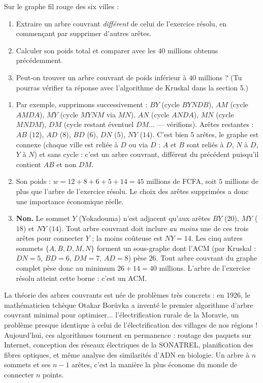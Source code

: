 \documentclass[11pt]{article}
\begin{document}
\begin{exercice}
Sur le graphe fil rouge des six villes :
\begin{enumerate}
\item Extraire un arbre couvrant \emph{différent} de celui de l'exercice résolu, en commençant par supprimer d'autres arêtes.
\item Calculer son poids total et comparer avec les $40$ millions obtenus précédemment.
\item Peut-on trouver un arbre couvrant de poids inférieur à $40$ millions ? (Tu pourras vérifier ta réponse avec l'algorithme de Kruskal dans la section 5.)
\end{enumerate}
\end{exercice}

\begin{corrige}
\begin{enumerate}
\item Par exemple, supprimons successivement : $BY$ (cycle $B Y N D B$), $AM$ (cycle $A M D A$), $MY$ (cycle $M Y N M$ via $MN$), $AN$ (cycle $A N D A$), $MN$ (cycle $M N D M$), $DM$ (cycle restant éventuel $D M \ldots$ — vérifions). Arêtes restantes : $AB$ ($12$), $AD$ ($8$), $BD$ ($6$), $DN$ ($5$), $NY$ ($14$). C'est bien $5$ arêtes, le graphe est connexe (chaque ville est reliée à $D$ ou via $D$ : $A$ et $B$ sont reliés à $D$, $N$ à $D$, $Y$ à $N$) et sans cycle : c'est un arbre couvrant, différent du précédent puisqu'il contient $AB$ et non $DM$.
\item Son poids : $w = 12 + 8 + 6 + 5 + 14 = 45$ millions de FCFA, soit $5$ millions de plus que l'arbre de l'exercice résolu. Le choix des arêtes supprimées a donc une importance économique réelle.
\item \textbf{Non.} Le sommet $Y$ (Yokadouma) n'est adjacent qu'aux arêtes $BY$ ($20$), $MY$ ($18$) et $NY$ ($14$). Tout arbre couvrant doit inclure \emph{au moins} une de ces trois arêtes pour connecter $Y$ ; la moins coûteuse est $NY = 14$. Les cinq autres sommets $\{A,B,D,M,N\}$ forment un sous-graphe dont l'ACM (par Kruskal : $DN=5$, $BD=6$, $DM=7$, $AD=8$) pèse $26$. Tout arbre couvrant du graphe complet pèse donc au minimum $26 + 14 = 40$ millions. L'arbre de l'exercice résolu atteint cette borne : c'est un ACM.
\end{enumerate}
\end{corrige}

\begin{savaistu}
La théorie des arbres couvrants est née de problèmes très concrets : en 1926, le mathématicien tchèque Otakar Borůvka a inventé le premier algorithme d'arbre couvrant minimal pour optimiser... l'électrification rurale de la Moravie, un problème presque identique à celui de l'électrification des villages de nos régions ! Aujourd'hui, ces algorithmes tournent en permanence : routage des paquets sur Internet, conception des réseaux électriques de la SONATREL, planification des fibres optiques, et même analyse des similarités d'ADN en biologie. Un arbre à $n$ sommets et ses $n - 1$ arêtes, c'est la manière la plus économe du monde de connecter $n$ points.
\end{savaistu}
\end{document}
